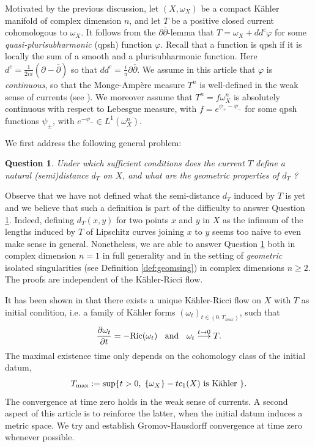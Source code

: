\documentclass[a4paper,11pt,leqno,english]{smfart}
\theoremstyle{plain}
\theoremstyle{plain}
\newtheorem{ques}{Question}
\numberwithin{equation}{section} %
\numberwithin{figure}{section} %
\theoremstyle{plain}
\theoremstyle{plain}
\theoremstyle{remark}
\theoremstyle{remark}
\theoremstyle{definition}
\theoremstyle{plain}
\theoremstyle{plain}
\theoremstyle{definition}
\newcommand{\f}{\varphi}
\newcommand{\p}{\psi}
\begin{document}
   Motivated by the previous discussion, let $(X,\omega_X)$ be a compact K\"ahler manifold of complex dimension $n$,
and let $T$ be a positive closed current cohomologous to $\omega_X$.
 It follows from the $\partial\overline{\partial}$-lemma that $T=\omega_X+dd^c \f$
for some {\it quasi-plurisubharmonic} (qpsh) function $\f$. Recall that a function
is qpsh if it is locally the sum of a smooth and a plurisubharmonic function.
Here $d^c=\frac{1}{2i \pi}(\partial-\overline{\partial})$ 
 so that $dd^c =\frac{i}{\pi}\partial\overline{\partial}$.
We assume in this article that $\f$
is {\it continuous}, so that the Monge-Amp\`ere measure $T^n$ is well-defined in the weak 
sense of currents (see \cite{GZbook}). We moreover assume that 
$T^n=f \omega_X^n$ is absolutely continuous with respect to Lebesgue measure,
with $f=e^{\p_+-\p_-}$ for some qpsh functions $\p_{\pm}$,
with $e^{-\p_-} \in L^1(\omega_X^n)$.

\smallskip

 We first address the following general problem:

 \begin{ques}\label{ques-1}
 Under which sufficient conditions does the current $T$ define a natural (semi)distance $d_T$  on $X$, 
 and what are the geometric properties of $d_T$ ?
 \end{ques}
 
 Observe that we have not defined what the semi-distance $d_T$ induced by $T$ is yet and we believe that such a definition is part of the difficulty to answer Question \ref{ques-1}. Indeed, defining $d_T(x,y)$ for two points $x$ and $y$ in $X$ as the infimum
  of the lengths induced by $T$ of Lipschitz curves joining $x$ to $y$ seems too naive to even make sense in general.
   Nonetheless, we are able to answer Question \ref{ques-1} both in complex dimension $n=1$ in full generality and in the setting of \textit{geometric} isolated singularities (see Definition \ref{def:geomsing}) in  complex dimensions $n\geq 2$. 
The proofs are independent of the K\"ahler-Ricci flow.
 

 \smallskip
 
It has been shown in \cite{GZ17,DnL17} that there exists a unique K\"ahler-Ricci flow 
on $X$ with $T$ as initial condition, i.e. a family of 
K\"ahler forms $(\omega_t)_{t \in (0,T_{max})}$, such that
$$
\frac{\partial \omega_t}{\partial t}=-{\rm Ric}(\omega_t)
\; \; \text{ and } \; \;
\omega_t \stackrel{t \rightarrow 0}{\longrightarrow} T.
$$
The maximal existence time only depends on the cohomology class of the initial datum,
$$
T_{\rm max}:=\sup \{ t>0 , \; \{\omega_X\} -tc_1(X)  \text{ is K\"ahler } \}.\\
$$
The convergence at time zero holds in the weak sense of currents. A second aspect of this article is to reinforce the latter, 
when the initial datum induces a metric space.
We  try and establish Gromov-Hausdorff convergence at time zero whenever possible.
\end{document}
